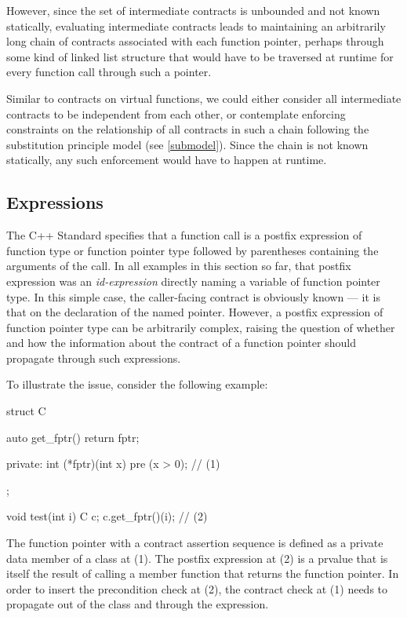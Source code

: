 However, since the set of intermediate contracts is unbounded and not known statically, evaluating intermediate contracts leads to maintaining an arbitrarily long chain of contracts associated with each function pointer, perhaps through some kind of linked list structure that would have to be traversed at runtime for every function call through such a pointer. 

Similar to contracts on virtual functions, we could either consider all intermediate contracts to be independent from each other, or contemplate enforcing constraints on the relationship of all contracts in such a chain following the substitution principle model (see \ref{submodel}). Since the chain is not known statically, any such enforcement would have to happen at runtime.

\subsection{Expressions}
\label{expr}

The C++ Standard specifies that a function call is a postfix expression of function type or function pointer type followed by parentheses containing the arguments of the call. In all examples in this section so far, that postfix expression was an \emph{id-expression} directly naming a variable of function pointer type. In this simple case, the caller-facing contract is obviously known --- it is that on the declaration of the named pointer. However, a postfix expression of function pointer type can be arbitrarily complex, raising the question of whether and how the information about the contract of a function pointer should propagate through such expressions.

To illustrate the issue, consider the following example:
\begin{codeblock}
struct C {
  auto get_fptr() { return fptr; }
  
private:
  int (*fptr)(int x) pre (x > 0);  // (1)
};

void test(int i) {
  C c;
  c.get_fptr()(i);  // (2)
}
\end{codeblock}
The function pointer with a contract assertion sequence is defined as a private data member of a class at (1). The postfix expression at (2) is a prvalue that is itself the result of calling a member function that returns the function pointer. In order to insert the precondition check at (2), the contract check at (1) needs to propagate out of the class and through the expression.

